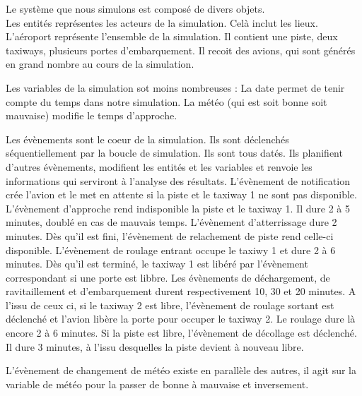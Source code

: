 

Le système que nous simulons est composé de divers objets. \\

Les entités représentes les acteurs de la simulation. Celà inclut les lieux.
  L'aéroport représente l'ensemble de la simulation. Il contient une piste, deux taxiways, plusieurs portes d'embarquement. Il recoit des avions, qui sont générés en grand nombre au cours de la simulation.
  
Les variables de la simulation sot moins nombreuses : La date permet de tenir compte du temps dans notre simulation. La météo (qui est soit bonne soit mauvaise) modifie le temps d'approche.
  
Les évènements sont le coeur de la simulation. Ils sont déclenchés séquentiellement par la boucle de simulation. Ils sont tous datés. Ils planifient d'autres évènements, modifient les entités et les variables et renvoie les informations qui serviront à l'analyse des résultats.
L'évènement de notification crée l'avion et le met en attente si la piste et le taxiway 1 ne sont pas disponible.
L'évènement d'approche rend indisponible la piste et le taxiway 1. Il dure 2 à 5 minutes, doublé en cas de mauvais temps.
L'évènement d'atterrissage dure 2 minutes. Dès qu'il est fini, l'évènement de relachement de piste rend celle-ci disponible.
L'évènement de roulage entrant occupe le taxiwy 1 et dure 2 à 6 minutes. Dès qu'il est terminé, le taxiway 1 est libéré par l'évènement correspondant si une porte est libbre. 
Les évènements de déchargement, de ravitaillement et d'embarquement durent respectivement 10, 30 et 20 minutes.
A l'issu de ceux ci, si le taxiway 2 est libre, l'évènement de roulage sortant est déclenché et l'avion libère la porte pour occuper le taxiway 2. Le roulage dure là encore 2 à 6 minutes.
Si la piste est libre, l'évènement de décollage est déclenché. Il dure 3 minutes, à l'issu desquelles la piste devient à nouveau libre.

L'évènement de changement de météo existe en parallèle des autres, il agit sur la variable de météo pour la passer de bonne à mauvaise et inversement.
